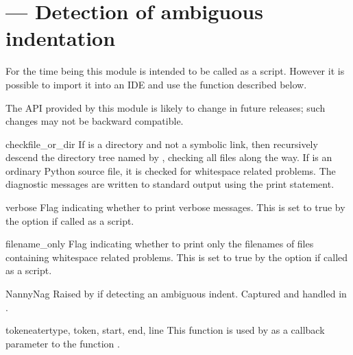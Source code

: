 \section{ ---
         Detection of ambiguous indentation}



For the time being this module is intended to be called as a script.
However it is possible to import it into an IDE and use the function
 described below.

  The API provided by this module is likely to change 
in future releases; such changes may not be backward compatible.

\begin{funcdesc}{check}{file_or_dir}
  If  is a directory and not a symbolic link, then
  recursively descend the directory tree named by ,
  checking all  files along the way.  If 
  is an ordinary Python source file, it is checked for whitespace
  related problems.  The diagnostic messages are written to standard
  output using the print statement.
\end{funcdesc}


\begin{datadesc}{verbose}
  Flag indicating whether to print verbose messages.
  This is set to true by the  option if called as a script.
\end{datadesc}


\begin{datadesc}{filename_only}
  Flag indicating whether to print only the filenames of files
  containing whitespace related problems.  This is set to true by the
   option if called as a script.
\end{datadesc}


\begin{excdesc}{NannyNag}
  Raised by  if detecting an ambiguous indent.
  Captured and handled in .
\end{excdesc}


\begin{funcdesc}{tokeneater}{type, token, start, end, line}
  This function is used by  as a callback parameter to
  the function .
\end{funcdesc}


\begin{seealso}
\end{seealso}
